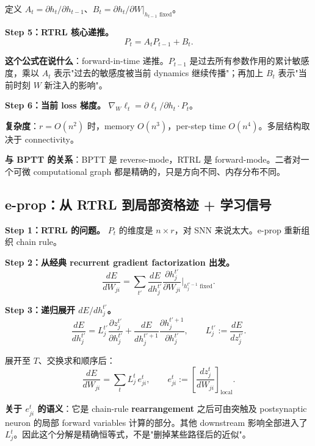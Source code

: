 \documentclass[journal,12pt,onecolumn]{IEEEtran}
\begin{document}
定义 $A_t=\partial h_t/\partial h_{t-1}$、$B_t=\partial h_t/\partial W|_{h_{t-1}\text{ fixed}}$。

\textbf{Step 5：RTRL 核心递推。}
\begin{equation}
P_t=A_t P_{t-1}+B_t.
\end{equation}

\textbf{这个公式在说什么}：forward-in-time 递推。$P_{t-1}$ 是过去所有参数作用的累计敏感度，乘以 $A_t$ 表示"过去的敏感度被当前 dynamics 继续传播"；再加上 $B_t$ 表示"当前时刻 $W$ 新注入的影响"。

\textbf{Step 6：当前 loss 梯度。} $\nabla_W\ell_t=\partial\ell_t/\partial h_t\cdot P_t$。

\textbf{复杂度}：$r=O(n^2)$ 时，memory $O(n^3)$，per-step time $O(n^4)$。多层结构取决于 connectivity。

\textbf{与 BPTT 的关系}：BPTT 是 reverse-mode，RTRL 是 forward-mode。二者对一个可微 computational graph 都是精确的，只是方向不同、内存分布不同。

\subsection{e-prop：从 RTRL 到局部资格迹 + 学习信号}

\textbf{Step 1：RTRL 的问题。} $P_t$ 的维度是 $n\times r$，对 SNN 来说太大。e-prop 重新组织 chain rule。

\textbf{Step 2：从经典 recurrent gradient factorization 出发。}
\begin{equation}
\frac{dE}{dW_{ji}}
=
\sum_{t'}
\frac{dE}{dh_j^{t'}}
\frac{\partial h_j^{t'}}{\partial W_{ji}}\Big|_{h_j^{t'-1}\text{ fixed}}.
\end{equation}

\textbf{Step 3：递归展开 $dE/dh_j^{t'}$。}
\begin{equation}
\frac{dE}{dh_j^{t'}}
=
L_j^{t'}\frac{\partial z_j^{t'}}{\partial h_j^{t'}}
+
\frac{dE}{dh_j^{t'+1}}\frac{\partial h_j^{t'+1}}{\partial h_j^{t'}},
\qquad
L_j^{t'}:=\frac{dE}{dz_j^{t'}}.
\end{equation}

展开至 $T$、交换求和顺序后：
\begin{equation}
\frac{dE}{dW_{ji}}
=
\sum_t L_j^t\,e_{ji}^t,
\qquad
e_{ji}^t
:=
\left[\frac{dz_j^t}{dW_{ji}}\right]_{\text{local}}.
\end{equation}

\textbf{关于 $e_{ji}^t$ 的语义}：它是 chain-rule \textbf{rearrangement} 之后可由突触及 postsynaptic neuron 的局部 forward variables 计算的部分。其他 downstream 影响全部进入了 $L_j^t$。因此这个分解是精确恒等式，不是"删掉某些路径后的近似"。
\end{document}
